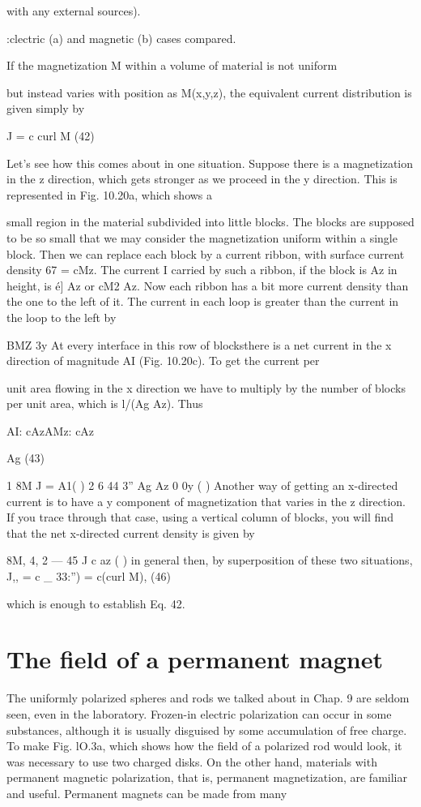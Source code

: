 {{{with any external sources).

:clectric (a) and magnetic (b) cases compared.

If the magnetization M within a volume of material is not uniform

but instead varies with position as M(x,y,z), the equivalent current
distribution is given simply by

J = c curl M (42)

Let's see how this comes about in one situation. Suppose there is a
magnetization in the z direction, which gets stronger as we proceed
in the y direction. This is represented in Fig. 10.20a, which shows a

small region in the material subdivided into little blocks. The blocks
are supposed to be so small that we may consider the magnetization
uniform within a single block. Then we can replace each block by
a current ribbon, with surface current density 67 = cMz. The current
I carried by such a ribbon, if the block is Az in height, is é] Az
or cM2 Az. Now each ribbon has a bit more current density than
the one to the left of it. The current in each loop is greater than the
current in the loop to the left by

BMZ
3y
At every interface in this row of blocksthere is a net current in the
x direction of magnitude AI (Fig. 10.20c). To get the current per

unit area flowing in the x direction we have to multiply by the number
of blocks per unit area, which is l/(Ag Az). Thus

AI: cAzAMz: cAz

Ag (43)

1 8M
J = A1( ) 2 6 44
3'' Ag Az 0 0y ( )
Another way of getting an x-directed current is to have a y component
of magnetization that varies in the z direction. If you trace
through that case, using a vertical column of blocks, you will find
that the net x-directed current density is given by

8M,
4, 2  ---  45
J c az ( )
in general then, by superposition of these two situations,
J,, = c  _ 33:'') = c(curl M), (46)

which is enough to establish Eq. 42.

\section{The field of a permanent magnet}

The uniformly polarized spheres and rods we talked about in
Chap. 9 are seldom seen, even in the laboratory. Frozen-in electric
polarization can occur in some substances, although it is usually
disguised by some accumulation of free charge. To make Fig. lO.3a,
which shows how the field of a polarized rod would look, it was necessary
to use two charged disks. On the other hand, materials with
permanent magnetic polarization, that is, permanent magnetization,
are familiar and useful. Permanent magnets can be made from many

}}}

